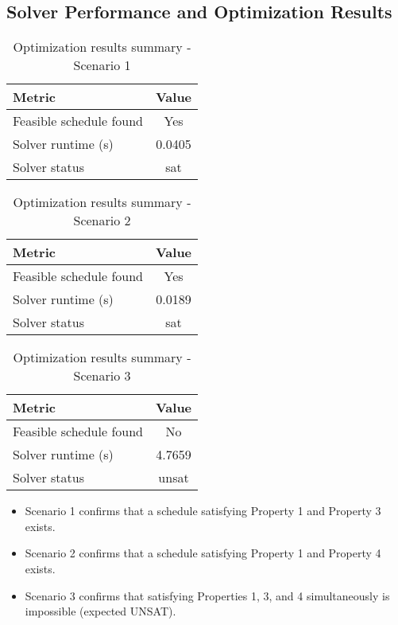 \documentclass{article}
\begin{document}
\subsection{Solver Performance and Optimization Results}

\begin{table}[H]
\centering
\caption{Optimization results summary - Scenario 1}
\begin{tabular}{l c}
\toprule
Metric & Value \\
\midrule
Feasible schedule found & Yes \\
Solver runtime (s) & 0.0405 \\
Solver status & sat \\
\bottomrule
\end{tabular}
\end{table}

\begin{table}[H]
\centering
\caption{Optimization results summary - Scenario 2}
\begin{tabular}{l c}
\toprule
Metric & Value \\
\midrule
Feasible schedule found & Yes \\
Solver runtime (s) & 0.0189 \\
Solver status & sat \\
\bottomrule
\end{tabular}
\end{table}

\begin{table}[H]
\centering
\caption{Optimization results summary - Scenario 3}
\begin{tabular}{l c}
\toprule
Metric & Value \\
\midrule
Feasible schedule found & No \\
Solver runtime (s) & 4.7659 \\
Solver status & unsat \\
\bottomrule
\end{tabular}
\end{table}

\begin{itemize}
    \item Scenario 1 confirms that a schedule satisfying Property 1 and Property 3 exists.
    \item Scenario 2 confirms that a schedule satisfying Property 1 and Property 4 exists.
    \item Scenario 3 confirms that satisfying Properties 1, 3, and 4 simultaneously is impossible (expected UNSAT).
\end{itemize}
\end{document}
